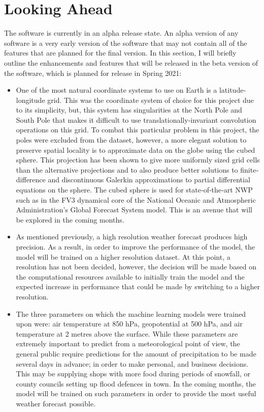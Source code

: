 \section{Looking Ahead}
The software is currently in an alpha release state. An alpha version of any software is a very early version of the software that may not contain all of the features that are planned for the final version\cite{alpha}. In this section, I will briefly outline the enhancements and features that will be released in the beta version of the software, which is planned for release in Spring 2021:

\begin{itemize}
    \item One of the most natural coordinate systems to use on Earth is a latitude‐longitude grid. This was the coordinate system of choice for this project due to its simplicity, but, this system has singularities at the North Pole and South Pole that makes it difficult to use translationally‐invariant convolution operations on this grid. To combat this particular problem in this project, the poles were excluded from the dataset, however, a more elegant solution to preserve spatial locality is to approximate data on the globe using the cubed sphere. This projection has been shown to give more uniformly sized grid cells than the alternative projections and to also produce better solutions to finite‐difference and discontinuous Galerkin approximations to partial differential equations on the sphere. The cubed sphere is used for state‐of‐the‐art NWP such as in the FV3 dynamical core of the National Oceanic and Atmospheric Administration's Global Forecast System model\cite{cubed_sphere}. This is an avenue that will be explored in the coming months. 
    \item As mentioned previously, a high resolution weather forecast produces high precision. As a result, in order to improve the performance of the model, the model will be trained on a higher resolution dataset. At this point, a resolution has not been decided, however, the decision will be made based on the computational resources available to initially train the model and the expected increase in performance that could be made by switching to a higher resolution. 
    \item The three parameters on which the machine learning models were trained upon were: air temperature at 850 hPa, geopotential at 500 hPa, and air temperature at 2 metres above the surface. While these parameters are extremely important to predict from a meteorological point of view, the general public require predictions for the amount of precipitation to be made several days in advance; in order to make personal, and business decisions. This may be supplying shops with more food during periods of snowfall, or county councils setting up flood defences in town. In the coming months, the model will be trained on such parameters in order to provide the most useful weather forecast possible.  
\end{itemize}